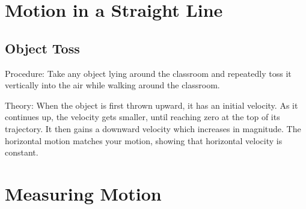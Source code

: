 \section{Motion in a Straight Line}

\begin{multicols}{2}




\subsection{Object Toss}


\begin{description*}
\item[Procedure:]{Take any object lying around the classroom and repeatedly toss it vertically into the air while walking around the classroom.}
\item[Theory:]{When the object is first thrown upward, it has an initial velocity. As it continues up, the velocity gets smaller, until reaching zero at the top of its trajectory. It then gains a downward velocity which increases in magnitude. The horizontal motion matches your motion, showing that horizontal velocity is constant.}
\end{description*}


\section*{Measuring Motion}



\end{multicols}
